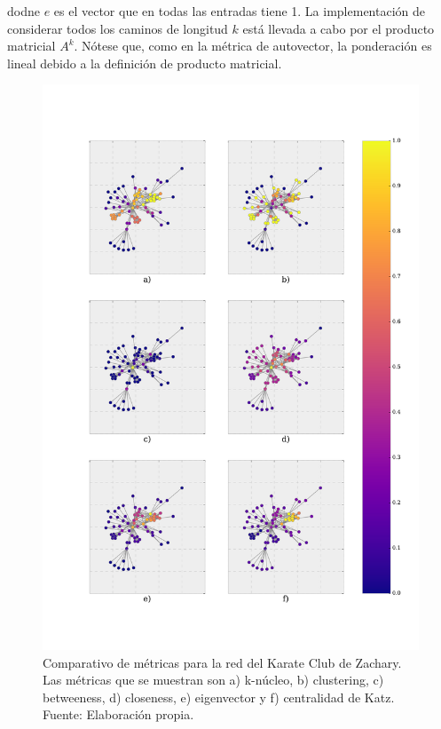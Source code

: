 \documentclass[../main.tex]{subfiles}
\begin{document}
dodne $e$ es el vector que en todas las entradas tiene 1. La implementación de considerar todos los caminos de longitud $k$ está llevada a cabo por el producto matricial $A^{k}$. Nótese que, como en la métrica de autovector, la ponderación es lineal debido a la definición de producto matricial.




\begin{figure}[h!]
    \centering
    \includegraphics[scale = 0.40]{images/marcoteorico_barabasi (1).pdf}
    \caption{Comparativo de métricas para la red del Karate Club  de Zachary. Las métricas que se muestran son a) k-núcleo, b) clustering, c) betweeness, d) closeness, e) eigenvector y  f) centralidad de Katz.   Fuente: Elaboración propia.}
    \label{fig:marcoteorico_scale_free}
\end{figure}
\end{document}
